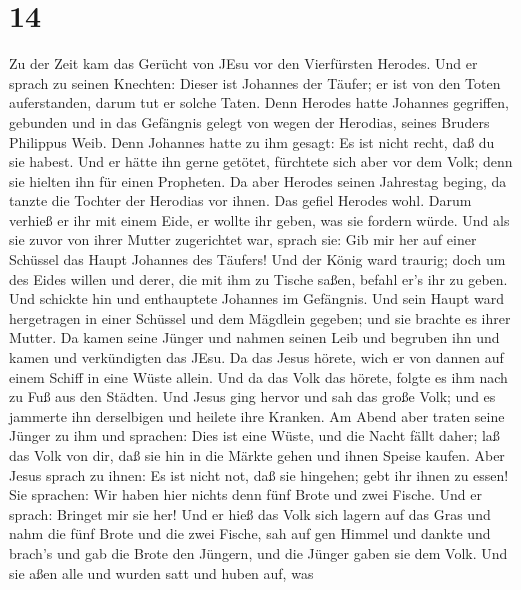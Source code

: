 \hypertarget{section-13}{%
\section{14}\label{section-13}}

 Zu der Zeit kam das Gerücht von JEsu vor den Vierfürsten
Herodes.  Und er sprach zu seinen Knechten: Dieser ist
Johannes der Täufer; er ist von den Toten auferstanden, darum tut er
solche Taten.  Denn Herodes hatte Johannes gegriffen,
gebunden und in das Gefängnis gelegt von wegen der Herodias, seines
Bruders Philippus Weib.  Denn Johannes hatte zu ihm gesagt:
Es ist nicht recht, daß du sie habest.  Und er hätte ihn
gerne getötet, fürchtete sich aber vor dem Volk; denn sie hielten ihn
für einen Propheten.  Da aber Herodes seinen Jahrestag
beging, da tanzte die Tochter der Herodias vor ihnen. Das gefiel Herodes
wohl.  Darum verhieß er ihr mit einem Eide, er wollte ihr
geben, was sie fordern würde.  Und als sie zuvor von ihrer
Mutter zugerichtet war, sprach sie: Gib mir her auf einer Schüssel das
Haupt Johannes des Täufers!  Und der König ward traurig;
doch um des Eides willen und derer, die mit ihm zu Tische saßen, befahl
er's ihr zu geben.  Und schickte hin und enthauptete
Johannes im Gefängnis.  Und sein Haupt ward hergetragen in
einer Schüssel und dem Mägdlein gegeben; und sie brachte es ihrer
Mutter.  Da kamen seine Jünger und nahmen seinen Leib und
begruben ihn und kamen und verkündigten das JEsu.  Da das
Jesus hörete, wich er von dannen auf einem Schiff in eine Wüste allein.
Und da das Volk das hörete, folgte es ihm nach zu Fuß aus den Städten.
 Und Jesus ging hervor und sah das große Volk; und es
jammerte ihn derselbigen und heilete ihre Kranken.  Am
Abend aber traten seine Jünger zu ihm und sprachen: Dies ist eine Wüste,
und die Nacht fällt daher; laß das Volk von dir, daß sie hin in die
Märkte gehen und ihnen Speise kaufen.  Aber Jesus sprach zu
ihnen: Es ist nicht not, daß sie hingehen; gebt ihr ihnen zu essen!
 Sie sprachen: Wir haben hier nichts denn fünf Brote und
zwei Fische.  Und er sprach: Bringet mir sie her!
 Und er hieß das Volk sich lagern auf das Gras und nahm die
fünf Brote und die zwei Fische, sah auf gen Himmel und dankte und
brach's und gab die Brote den Jüngern, und die Jünger gaben sie dem
Volk.  Und sie aßen alle und wurden satt und huben auf, was
